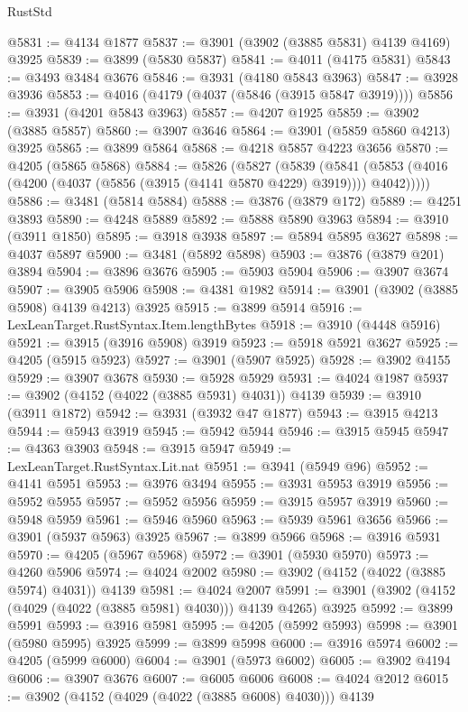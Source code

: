 \begin{lexlean}{RustStd}
\begin{coremodule}
@5831 := @4134 @1877
@5837 := @3901 (@3902 (@3885 @5831) @4139 @4169) @3925
@5839 := @3899 (@5830 @5837)
@5841 := @4011 (@4175 @5831)
@5843 := @3493 @3484 @3676
@5846 := @3931 (@4180 @5843 @3963)
@5847 := @3928 @3936
@5853 := @4016 (@4179 (@4037 (@5846 (@3915 @5847 @3919))))
@5856 := @3931 (@4201 @5843 @3963)
@5857 := @4207 @1925
@5859 := @3902 (@3885 @5857)
@5860 := @3907 @3646
@5864 := @3901 (@5859 @5860 @4213) @3925
@5865 := @3899 @5864
@5868 := @4218 @5857 @4223 @3656
@5870 := @4205 (@5865 @5868)
@5884 := @5826
    (@5827
      (@5839
        (@5841 (@5853 (@4016 (@4200 (@4037 (@5856 (@3915 (@4141 @5870 @4229) @3919)))) @4042)))))
@5886 := @3481 (@5814 @5884)
@5888 := @3876 (@3879 @172)
@5889 := @4251 @3893
@5890 := @4248 @5889
@5892 := @5888 @5890 @3963
@5894 := @3910 (@3911 @1850)
@5895 := @3918 @3938
@5897 := @5894 @5895 @3627
@5898 := @4037 @5897
@5900 := @3481 (@5892 @5898)
@5903 := @3876 (@3879 @201) @3894
@5904 := @3896 @3676
@5905 := @5903 @5904
@5906 := @3907 @3674
@5907 := @3905 @5906
@5908 := @4381 @1982
@5914 := @3901 (@3902 (@3885 @5908) @4139 @4213) @3925
@5915 := @3899 @5914
@5916 := LexLeanTarget.RustSyntax.Item.lengthBytes
@5918 := @3910 (@4448 @5916)
@5921 := @3915 (@3916 @5908) @3919
@5923 := @5918 @5921 @3627
@5925 := @4205 (@5915 @5923)
@5927 := @3901 (@5907 @5925)
@5928 := @3902 @4155
@5929 := @3907 @3678
@5930 := @5928 @5929
@5931 := @4024 @1987
@5937 := @3902 (@4152 (@4022 (@3885 @5931) @4031)) @4139
@5939 := @3910 (@3911 @1872)
@5942 := @3931 (@3932 @47 @1877)
@5943 := @3915 @4213
@5944 := @5943 @3919
@5945 := @5942 @5944
@5946 := @3915 @5945
@5947 := @4363 @3903
@5948 := @3915 @5947
@5949 := LexLeanTarget.RustSyntax.Lit.nat
@5951 := @3941 (@5949 @96)
@5952 := @4141 @5951
@5953 := @3976 @3494
@5955 := @3931 @5953 @3919
@5956 := @5952 @5955
@5957 := @5952 @5956
@5959 := @3915 @5957 @3919
@5960 := @5948 @5959
@5961 := @5946 @5960
@5963 := @5939 @5961 @3656
@5966 := @3901 (@5937 @5963) @3925
@5967 := @3899 @5966
@5968 := @3916 @5931
@5970 := @4205 (@5967 @5968)
@5972 := @3901 (@5930 @5970)
@5973 := @4260 @5906
@5974 := @4024 @2002
@5980 := @3902 (@4152 (@4022 (@3885 @5974) @4031)) @4139
@5981 := @4024 @2007
@5991 := @3901 (@3902 (@4152 (@4029 (@4022 (@3885 @5981) @4030))) @4139 @4265) @3925
@5992 := @3899 @5991
@5993 := @3916 @5981
@5995 := @4205 (@5992 @5993)
@5998 := @3901 (@5980 @5995) @3925
@5999 := @3899 @5998
@6000 := @3916 @5974
@6002 := @4205 (@5999 @6000)
@6004 := @3901 (@5973 @6002)
@6005 := @3902 @4194
@6006 := @3907 @3676
@6007 := @6005 @6006
@6008 := @4024 @2012
@6015 := @3902 (@4152 (@4029 (@4022 (@3885 @6008) @4030))) @4139

\end{coremodule}
\end{lexlean}
